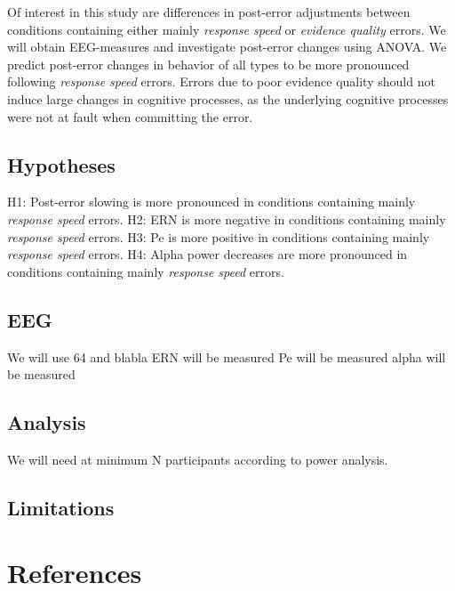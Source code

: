\documentclass[
  man,floatsintext]{apa7}
\newlength{\cslhangindent}
\newlength{\cslentryspacingunit} %
\newenvironment{CSLReferences}[2] %
 {%
  \setlength{\parindent}{0pt}
  \ifodd #1
  \let\oldpar\par
  \def\par{\hangindent=\cslhangindent\oldpar}
  \fi
  \setlength{\parskip}{#2\cslentryspacingunit}
 }%
 {}
\begin{document}
Of interest in this study are differences in post-error adjustments between conditions containing either mainly \emph{response speed} or \emph{evidence quality} errors. We will obtain EEG-measures and investigate post-error changes using ANOVA. We predict post-error changes in behavior of all types to be more pronounced following \emph{response speed} errors. Errors due to poor evidence quality should not induce large changes in cognitive processes, as the underlying cognitive processes were not at fault when committing the error.

\hypertarget{hypotheses}{%
\subsection{Hypotheses}\label{hypotheses}}

H1: Post-error slowing is more pronounced in conditions containing mainly \emph{response speed} errors.
H2: ERN is more negative in conditions containing mainly \emph{response speed} errors.
H3: Pe is more positive in conditions containing mainly \emph{response speed} errors.
H4: Alpha power decreases are more pronounced in conditions containing mainly \emph{response speed} errors.

\hypertarget{eeg}{%
\subsection{EEG}\label{eeg}}

We will use 64 and blabla
ERN will be measured
Pe will be measured
alpha will be measured

\hypertarget{analysis}{%
\subsection{Analysis}\label{analysis}}

We will need at minimum N participants according to power analysis.

\hypertarget{limitations}{%
\subsection{Limitations}\label{limitations}}

\newpage

\hypertarget{references}{%
\section{References}\label{references}}

\hypertarget{refs}{}
\begin{CSLReferences}{0}{0}
\end{CSLReferences}
\end{document}
